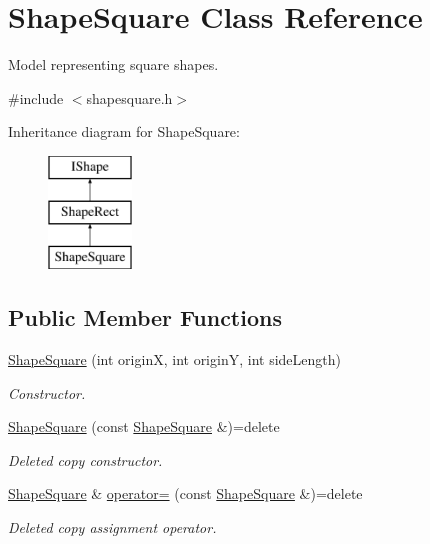 \hypertarget{class_shape_square}{}\section{Shape\+Square Class Reference}
\label{class_shape_square}


Model representing square shapes.  




{\ttfamily \#include $<$shapesquare.\+h$>$}

Inheritance diagram for Shape\+Square\+:\begin{figure}[H]
\begin{center}
\leavevmode
\includegraphics[height=3.000000cm]{class_shape_square}
\end{center}
\end{figure}
\subsection*{Public Member Functions}
\begin{DoxyCompactItemize}
\item 
\mbox{\hyperlink{class_shape_square_a88fab70ce4fa11871d12fdfdb60c2189}{Shape\+Square}} (int originX, int originY, int side\+Length)
\begin{DoxyCompactList}\small\item\em Constructor. \end{DoxyCompactList}\item 
\mbox{\hyperlink{class_shape_square_afebaae8c8dcbc004c637d9efee10e120}{Shape\+Square}} (const \mbox{\hyperlink{class_shape_square}{Shape\+Square}} \&)=delete
\begin{DoxyCompactList}\small\item\em Deleted copy constructor. \end{DoxyCompactList}\item 
\mbox{\hyperlink{class_shape_square}{Shape\+Square}} \& \mbox{\hyperlink{class_shape_square_af1909440887eed998f5723c8511a0432}{operator=}} (const \mbox{\hyperlink{class_shape_square}{Shape\+Square}} \&)=delete
\begin{DoxyCompactList}\small\item\em Deleted copy assignment operator. \end{DoxyCompactList}\end{DoxyCompactItemize}

